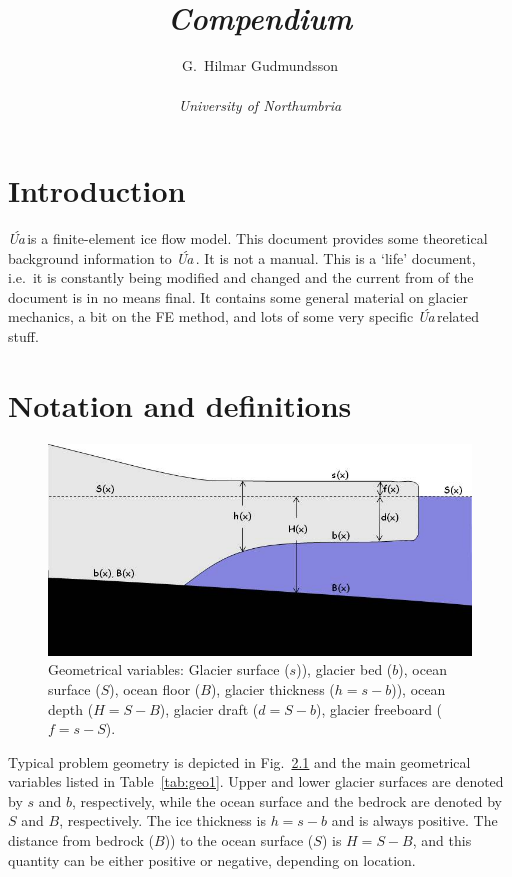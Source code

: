 \documentclass[10pt,a4paper]{book}
\title{\Ua\\{\it Compendium}}
\author{G.~Hilmar Gudmundsson\\ \\ \textit{University of Northumbria}}
\newcommand{\Ua}{\textsl{\'Ua}\,}
\begin{document}
\maketitle
\tableofcontents

\frontmatter
\chapter{Introduction}
\Ua is a finite-element ice flow model.  This document provides some
theoretical background information to \Ua. It is not a manual. This is
a `life' document, i.e.\ it is constantly being modified and changed
and the current from of the document is in no means final. It contains
some general material on glacier mechanics, a bit on the FE method,
and lots of some very specific \Ua related stuff. 

\chapter{Notation and definitions}




\begin{figure}
\centerline{\includegraphics[width=12cm]{ProblemGeometry.jpg}}
\caption{Geometrical variables: Glacier surface ($s$)), glacier bed ($b$), ocean surface ($S$), ocean floor ($B$), 
glacier thickness ($h=s-b$)), ocean depth ($H=S-B$), glacier draft ($d=S-b$), glacier freeboard ($f=s-S$). 
\label{fig:PG}}
\end{figure}

Typical problem geometry is depicted in Fig.~\ref{fig:PG} and the main
geometrical variables listed in Table~\ref{tab:geo1}.  Upper and lower
glacier surfaces are denoted by $s$ and $b$, respectively, while the
ocean surface and the bedrock are denoted by $S$ and $B$,
respectively.  The ice thickness is $h=s-b$ and is always
positive. The distance from bedrock ($B$)) to the ocean surface ($S$)
is $H=S-B$, and this quantity can be either positive or negative,
depending on location.
\end{document}
